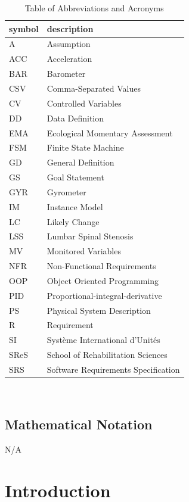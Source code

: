 \documentclass[12pt]{article}
\begin{document}
\renewcommand{\arraystretch}{1.2}
\begin{table}[H]
	\caption{\label{abbacr}Table of Abbreviations and Acronyms}  
	\noindent\begin{tabular}{l l} 
	  \toprule		
	  \textbf{symbol} & \textbf{description}\\
	  \midrule 
	  A & Assumption\\
	  ACC & Acceleration\\
	  BAR & Barometer\\
	  CSV & Comma-Separated Values\\
	  CV & Controlled Variables\\
	  DD & Data Definition\\
	  EMA & Ecological Momentary Assessment\\
	  FSM & Finite State Machine\\
	  GD & General Definition\\
	  GS & Goal Statement\\
	  GYR & Gyrometer\\
	  IM & Instance Model\\
	  LC & Likely Change\\
	  LSS & Lumbar Spinal Stenosis\\
	  MV & Monitored Variables\\
	  NFR & Non-Functional Requirements\\
	  OOP & Object Oriented Programming\\
	  PID & Proportional-integral-derivative\\
	  PS & Physical System Description\\
	  R & Requirement\\
	  SI & Syst\`{e}me International d'Unit\'{e}s\\
	  SReS & School of Rehabilitation Sciences\\
	  SRS & Software Requirements Specification\\
	
	  \bottomrule
	\end{tabular}\\

\end{table}

\subsection{Mathematical Notation}
N/A


\section{Introduction}
\label{Intro}
\end{document}
